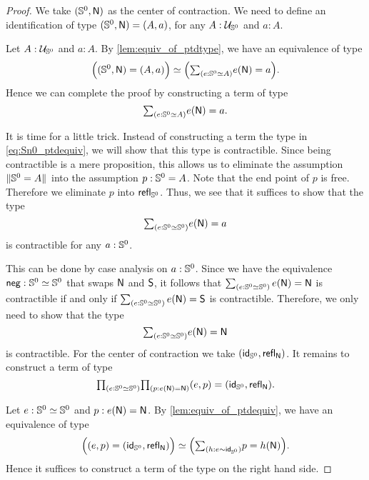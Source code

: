 \begin{proof}
We take $\pairr{\sphere{0},\north}$ as the center of contraction. We need to define
an identification of type $\pairr{\sphere{0},\north}=\pairr{A,a}$, 
for any $A:\UU_{\sphere{0}}$ and $a:A$. 

Let $A:\UU_{\sphere{0}}$ and $a:A$. By \autoref{lem:equiv_of_ptdtype}, we have
an equivalence of type
\begin{equation*}
\eqv{\Big(\pairr{\sphere{0},\north}=\pairr{A,a}\Big)}{\Big(\sm{e:\eqv{\sphere{0}}{A}}e(\north)=a\Big)}.
\end{equation*}
Hence we can complete the proof by constructing a term of type 
\begin{equation}\label{eq:Sn0_ptdequiv}
\sm{e:\eqv{\sphere{0}}{A}}e(\north)=a.
\end{equation} 

It is time for a little trick. Instead of constructing a term the type in
\autoref{eq:Sn0_ptdequiv}, we will show that this type is contractible.
Since being contractible is a mere proposition, 
this allows us to eliminate the assumption $\brck{\sphere{0}=A}$
into the assumption $p:\sphere{0}=A$. Note that the end point of $p$ is free.
Therefore we eliminate $p$ into $\refl{\sphere{0}}$. 
Thus, we see that it suffices to show that the type
\begin{equation*}
\sm{e:\eqv{\sphere{0}}{\sphere{0}}}e(\north)=a
\end{equation*}
is contractible for any $a:\sphere{0}$. 

This can be done by case analysis on $a:\sphere{0}$. Since we have the equivalence
$\bneg:\eqv{\sphere{0}}{\sphere{0}}$ that swaps $\north$ and $\south$, it follows
that $\sm{e:\eqv{\sphere{0}}{\sphere{0}}}e(\north)=\north$ is contractible if and only
if $\sm{e:\eqv{\sphere{0}}{\sphere{0}}}e(\north)=\south$ is contractible. Therefore, we
only need to show that the type
\begin{equation*}
\sm{e:\eqv{\sphere{0}}{\sphere{0}}}e(\north)=\north
\end{equation*}
is contractible. 
For the center of contraction we take $\pairr{\idfunc[\sphere{0}],\refl{\north}}$.
It remains to construct a term of type
\begin{equation*}
\prd{e:\eqv{\sphere{0}}{\sphere{0}}}{p:e(\north)=\north} \pairr{e,p}=\pairr{\idfunc[\sphere{0}],\refl{\north}}.
\end{equation*} 

Let $e:\eqv{\sphere{0}}{\sphere{0}}$ and $p:e(\north)=\north$.
By \autoref{lem:equiv_of_ptdequiv}, we have an equivalence of type
\begin{equation*}
\eqv{\Big(\pairr{e,p}=\pairr{\idfunc[\sphere{0}],\refl{\north}}\Big)}
    {\Big(\sm{h:e\htpy \idfunc[\sphere{0}]} p=h(\north)\Big)}.
\end{equation*}
Hence it suffices
to construct a term of the type on the right hand side.


\end{proof}
